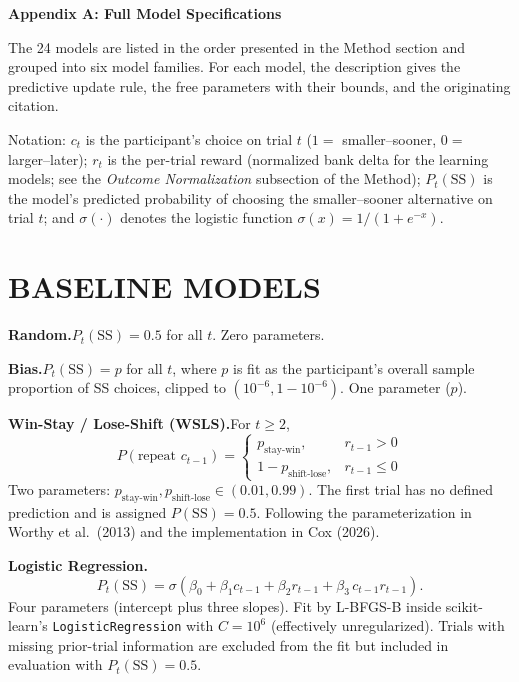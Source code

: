 \documentclass[12pt]{article}
\begin{document}
\begin{center}
\normalsize\textbf{Appendix A: Full Model Specifications}
\end{center}

\indent The 24 models are listed in the order presented in the Method section and grouped into six model families. For each model, the description gives the predictive update rule, the free parameters with their bounds, and the originating citation. 

Notation: $c_t$ is the participant's choice on trial $t$ ($1 =$ smaller--sooner, $0 =$ larger--later); $r_t$ is the per-trial reward (normalized bank delta for the learning models; see the \textit{Outcome Normalization} subsection of the Method); $P_t(\mathrm{SS})$ is the model's predicted probability of choosing the smaller--sooner alternative on trial $t$; and $\sigma(\cdot)$ denotes the logistic function $\sigma(x) = 1 / (1 + e^{-x})$.

\section*{BASELINE MODELS}

\textbf{Random.}\quad $P_t(\mathrm{SS}) = 0.5$ for all $t$. Zero parameters.

\textbf{Bias.}\quad $P_t(\mathrm{SS}) = p$ for all $t$, where $p$ is fit as the participant's overall sample proportion of SS choices, clipped to $(10^{-6}, 1 - 10^{-6})$. One parameter ($p$).

\textbf{Win-Stay / Lose-Shift (WSLS).}\quad For $t \geq 2$,
\[
P(\text{repeat } c_{t-1}) =
\begin{cases}
p_{\text{stay-win}}, & r_{t-1} > 0 \\
1 - p_{\text{shift-lose}}, & r_{t-1} \leq 0
\end{cases}
\]
Two parameters: $p_{\text{stay-win}}, p_{\text{shift-lose}} \in (0.01, 0.99)$. The first trial has no defined prediction and is assigned $P(\mathrm{SS}) = 0.5$. Following the parameterization in Worthy et al.\ (2013) and the implementation in Cox (2026).

\textbf{Logistic Regression.}
\[
P_t(\mathrm{SS}) = \sigma\!\left( \beta_0 + \beta_1 c_{t-1} + \beta_2 r_{t-1} + \beta_3\, c_{t-1} r_{t-1} \right).
\]
Four parameters (intercept plus three slopes). Fit by L-BFGS-B inside scikit-learn's \texttt{LogisticRegression} with $C = 10^{6}$ (effectively unregularized). Trials with missing prior-trial information are excluded from the fit but included in evaluation with $P_t(\mathrm{SS}) = 0.5$.
\end{document}
